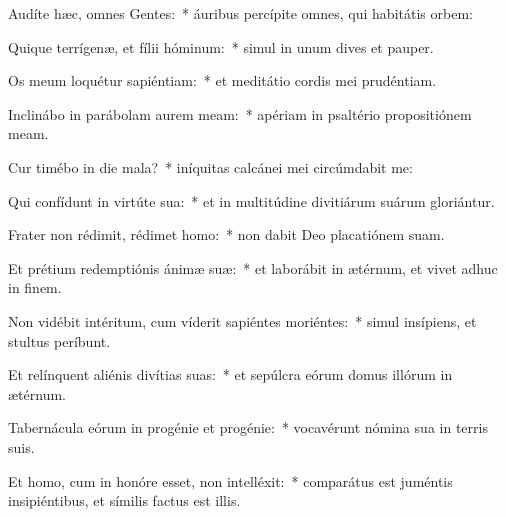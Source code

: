 \item Audíte hæc, omnes Gentes:~* áuribus percípite omnes, qui habitátis orbem:

\item Quique terrígenæ, et fílii hóminum:~* simul in unum dives et pauper.

\item Os meum loquétur sapiéntiam:~* et meditátio cordis mei prudéntiam.

\item Inclinábo in parábolam aurem meam:~* apériam in psaltério propositiónem meam.

\item Cur timébo in die mala?~* iníquitas calcánei mei circúmdabit me:

\item Qui confídunt in virtúte sua:~* et in multitúdine divitiárum suárum gloriántur.

\item Frater non rédimit, rédimet homo:~* non dabit Deo placatiónem suam.

\item Et prétium redemptiónis ánimæ suæ:~* et laborábit in ætérnum, et vivet adhuc in finem.

\item Non vidébit intéritum, cum víderit sapiéntes moriéntes:~* simul insípiens, et stultus períbunt.

\item Et relínquent aliénis divítias suas:~* et sepúlcra eórum domus illórum in ætérnum.

\item Tabernácula eórum in progénie et progénie:~* vocavérunt nómina sua in terris suis.

\item Et homo, cum in honóre esset, non intelléxit:~* comparátus est juméntis insipiéntibus, et símilis factus est illis.
